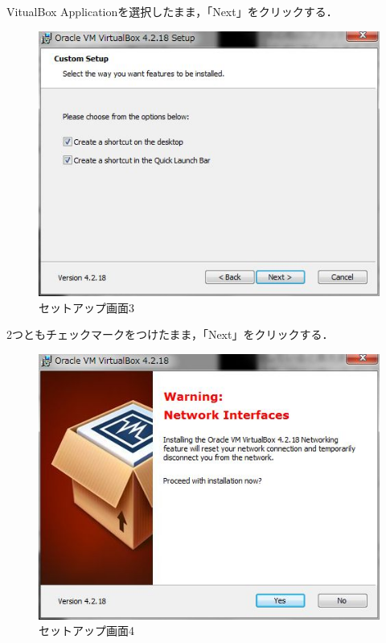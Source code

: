 VitualBox Applicationを選択したまま，「Next」をクリックする．


\begin{figure}[H]
\centering
\includegraphics[width=13cm]{VBsetup3.jpg}
\caption{セットアップ画面3}\label{サンプル図}
\end{figure}

2つともチェックマークをつけたまま，「Next」をクリックする．


\begin{figure}[H]
\centering
\includegraphics[width=13cm]{Warning.jpg}
\caption{セットアップ画面4}\label{サンプル図}
\end{figure}

